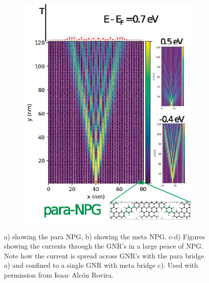 \begin{figure}[h]
\begin{subfigure}[b]{.45\textwidth}
	    \includegraphics[width=\textwidth]{Figures/Fig_3para.eps}
	    \caption{}
	    \label{studyfig3para}
	\end{subfigure}
\caption{a) showing the para NPG, b) showing the meta NPG.\newline
c-d) Figures showing the currents through the GNR's in a large peace of NPG. Note how the current is spread across GNR's with the para bridge a) and confined to a single GNR with meta bridge c). Used with permission from Isaac Alcón Rovira.}
\label{studyfigs}
\end{figure}
